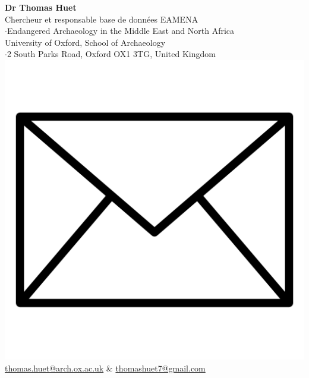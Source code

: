 \documentclass{article}
\begin{document}
\large{\textbf{Dr Thomas Huet}}\\
\normalsize
Chercheur et responsable base de données EAMENA\\
\small
$\cdot$Endangered Archaeology in the Middle East and North Africa\\
\normalsize
University of Oxford, School of Archaeology\\
\small
$\cdot$2 South Parks Road, Oxford OX1 3TG, United Kingdom
\normalsize
\\
\includegraphics[scale=0.025]{gmail} \quad \href{mailto:thomas.huet@arch.ox.ac.uk}{thomas.huet@arch.ox.ac.uk} \& \href{mailto:thomashuet7@gmail.com}{thomashuet7@gmail.com}\\
\end{document}
